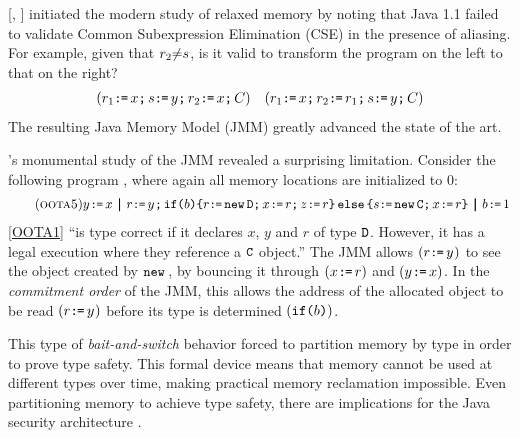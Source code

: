 \citeauthor{DBLP:conf/java/Pugh99} [\citeyear{DBLP:conf/java/Pugh99},
] initiated the modern study of relaxed memory by noting that
Java 1.1 failed to validate Common Subexpression Elimination (CSE) in the
presence of aliasing. For example, given that $r_2{\neq}s$, is it valid
to transform the program on the left to that on the right?
\begin{align*}
  ({r_1\texttt{:}\mkern-1mu\texttt{=}\, x \texttt{;}\,\allowbreak
    s\texttt{:}\mkern-1mu\texttt{=}\, y \texttt{;}\,\allowbreak  
    r_2\texttt{:}\mkern-1mu\texttt{=}\, x\texttt{;}\,\allowbreak C})
  &&
  ({r_1\texttt{:}\mkern-1mu\texttt{=}\, x \texttt{;}\,\allowbreak     
    r_2\texttt{:}\mkern-1mu\texttt{=}\, r_1\texttt{;}\,\allowbreak
    s\texttt{:}\mkern-1mu\texttt{=}\, y \texttt{;}\,\allowbreak C})
\end{align*}
The resulting Java Memory Model (JMM) \cite{Manson:2005:JMM:1047659.1040336}
greatly advanced the state of the art.

\citeauthor{DBLP:journals/toplas/Lochbihler13}'s
monumental study of the JMM
revealed a surprising limitation. Consider the following program
\citep[Fig.~8]{DBLP:journals/toplas/Lochbihler13}, where again
all memory locations are initialized to $0$:
\begin{gather}
  \tag{\textsc{oota5}}\label{OOTA1}
  \PW{y}{x}
  \PAR
  \PR{y}{\aReg} \SEMI \IF{b} \THEN \LET{\aReg}{\NEW \classD} \SEMI \PW{x}{\aReg} \SEMI \PW{z}{\aReg} \ELSE \LET{\bReg}{\NEW \classC} \SEMI \PW{x}{\aReg} \FI  
  \PAR %
  \PW{b}{1}
\end{gather}
\ref{OOTA1} ``is type correct if it declares $x$, $y$ and $r$ of type
$\mathtt{D}$. However, it has a legal execution where they reference a $\mathtt{C}$
object.''  The JMM allows $(\PR{y}{\aReg})$ to see the object created by
$\texttt{new}\,$, by bouncing it through $(\PW{x}{\aReg})$ and $(\PW{y}{x})$.  In the
\emph{commitment order} of the JMM, this allows the address of the
allocated object to be read $(\PR{y}{\aReg})$ before its type is determined
$(\texttt{if}\allowbreak\texttt{(}b\texttt{)})$.

This type of \emph{bait-and-switch} behavior forced
\citeauthor{DBLP:journals/toplas/Lochbihler13} to partition memory by type in
order to prove type safety.  This formal device means that memory cannot be
used at different types over time, making practical memory reclamation
impossible.  Even partitioning memory to achieve type safety, there are
implications for the Java security architecture
\cite[]{DBLP:journals/toplas/Lochbihler13}.

